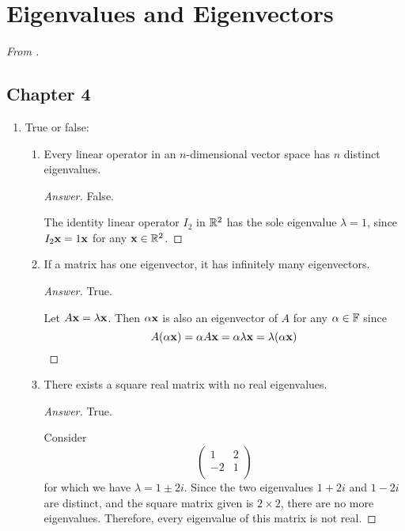 \documentclass[../psets.tex]{subfiles}
\begin{document}
\section{Eigenvalues and Eigenvectors}
\emph{From \textcite{bib:Treil}.}
\subsection*{Chapter 4}
\begin{enumerate}[label={\textbf{1.\arabic*.}}]
    \item {}True or false:
    \begin{enumerate}
        \item Every linear operator in an $n$-dimensional vector space has $n$ distinct eigenvalues.
        \begin{proof}[Answer]
            False.\par
            The identity linear operator $I_2$ in $\mathbb{R}^2$  has the sole eigenvalue $\lambda=1$, since $I_2\mathbf{x}=1\mathbf{x}$ for any $\mathbf{x}\in\mathbb{R}^2$.
        \end{proof}
        \item If a matrix has one eigenvector, it has infinitely many eigenvectors.
        \begin{proof}[Answer]
            True.\par
            Let $A\mathbf{x}=\lambda\mathbf{x}$. Then $\alpha\mathbf{x}$ is also an eigenvector of $A$ for any $\alpha\in\mathbb{F}$ since
            \begin{equation*}
                A(\alpha\mathbf{x}) = \alpha A\mathbf{x} = \alpha\lambda\mathbf{x} = \lambda(\alpha\mathbf{x})
            \end{equation*}
        \end{proof}
        \item There exists a square real matrix with no real eigenvalues.
        \begin{proof}[Answer]
            True.\par
            Consider
            \begin{equation*}
                \begin{pmatrix}
                    1 & 2\\
                    -2 & 1\\
                \end{pmatrix}
            \end{equation*}
            for which we have $\lambda=1\pm 2i$. Since the two eigenvalues $1+2i$ and $1-2i$ are distinct, and the square matrix given is $2\times 2$, there are no more eigenvalues. Therefore, every eigenvalue of this matrix is not real.

\end{proof}
\end{enumerate}
\end{enumerate}
\end{document}
